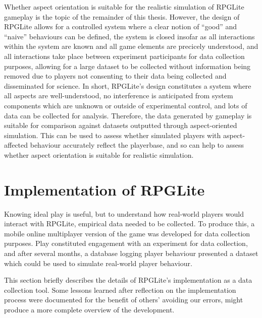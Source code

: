 Whether aspect orientation is suitable for the realistic simulation of RPGLite
gameplay is the topic of the remainder of this thesis. However, the design of
RPGLite allows for a controlled system where a clear notion of ``good'' and
``naive'' behaviours can be defined, the system is closed insofar as all
interactions within the system are known and all game elements are precicely
understood, and all interactions take place between experiment participants for
data collection purposes, allowing for a large dataset to be collected without
information being removed due to players not consenting to their data being
collected and disseminated for science. In short, RPGLite's design constitutes a
system where all aspects are well-understood, no interference is anticipated
from system components which are unknown or outside of experimental control, and
lots of data can be collected for analysis. Therefore, the data generated by
gameplay is suitable for comparison against datasets outputted through
aspect-oriented simulation. This can be used to assess whether simulated players
with aspect-affected behaviour accurately reflect the playerbase, and so can
help to assess whether aspect orientation is suitable for realistic simulation.


\section{Implementation of RPGLite}

Knowing ideal play is useful, but to understand how real-world players would
interact with RPGLite, empirical data needed to be collected. To produce this, a
mobile online multiplayer version of the game was developed for data collection
purposes. Play constituted engagement with an experiment for data collection,
and after several months, a database logging player behaviour presented a
dataset which could be used to simulate real-world player behaviour.

This section briefly describes the details of RPGLite's implementation as a data
collection tool. Some lessons learned after reflection on the implementation
process were documented for the benefit of others' avoiding our
errors\cite{RPGLiteLessonsLearned}, might produce a more complete overview of
the development.

